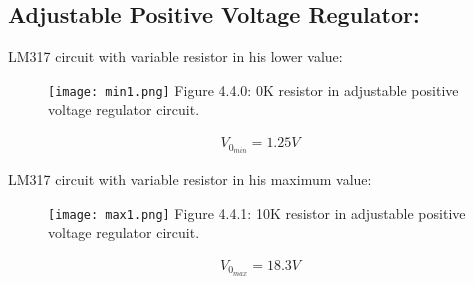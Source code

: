 \subsection{Adjustable Positive Voltage Regulator:}

\begin{tasks}
\task LM317 circuit with variable resistor in his lower value:
\begin{figure}[H]
\texttt{[image: min1.png]}
\centering \linebreak \linebreak Figure 4.4.0: 0K resistor in adjustable positive voltage regulator circuit.
\end{figure}

\begin{ceqn}
\begin{align}
V_{0_{min}} = 1.25 V
\end{align}
\end{ceqn}

\task LM317 circuit with variable resistor in his maximum value:
\begin{figure}[H]
\texttt{[image: max1.png]}
\centering \linebreak \linebreak Figure 4.4.1: 10K resistor in adjustable positive voltage regulator circuit.
\end{figure}

\begin{ceqn}
\begin{align}
V_{0_{max}} = 18.3 V
\end{align}
\end{ceqn}
\end{tasks}

\pagebreak